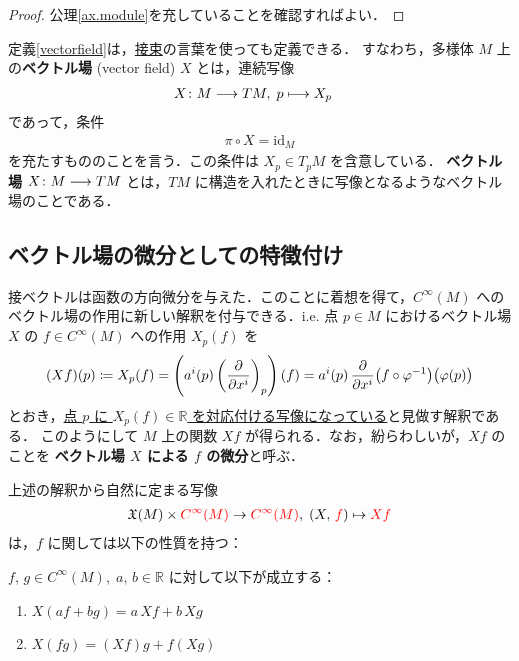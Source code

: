\documentclass[geometry_main]{subfiles}
\begin{document}
\begin{proof}
	公理\ref{ax.module}を充していることを確認すればよい．
\end{proof}

定義\ref{vectorfield}は，\hyperref[def:bundle-tangent]{接束}の言葉を使っても定義できる．
すなわち，\cinfty 多様体 $M$ 上の\textbf{ベクトル場} (vector field) $X$ とは，連続写像
\begin{align}
	X \colon M &\longrightarrow TM,\; p \longmapsto X_p
\end{align}
であって，条件
\begin{align}
	\pi \circ X = \mathrm{id}_M
\end{align}
を充たすもののことを言う．この条件は $X_p \in T_p M$ を含意している．
\cinfty \textbf{ベクトル場} $X\colon M \longrightarrow TM$ とは，$TM$ に\cinfty 構造を入れたときに\cinfty 写像となるようなベクトル場のことである．

\subsection{ベクトル場の微分としての特徴付け}

接ベクトルは函数の方向微分を与えた．このことに着想を得て，$C^\infty (M)$ へのベクトル場の作用に新しい解釈を付与できる．i.e. 点 $p \in M$ におけるベクトル場 $X$ の $f \in C^\infty (M)$ への作用 $X_p(f)$ を
\begin{align}
	(Xf)(p) \coloneqq X_p(f) = \left(a^i(p) \left(\pdv{}{x^i}\right)_p\right)(f) = a^i(p)\, \pdv{}{x^i}\bigl(f \circ \varphi^{-1} \bigr)\bigl(\varphi(p)\bigr)
\end{align}
とおき，\underline{点 $p$ に $X_p(f) \in \mathbb{R}$ を対応付ける写像になっている}と見做す解釈である．
このようにして $M$ 上の\cinfty 関数 $Xf$ が得られる．なお，紛らわしいが，$Xf$ のことを \textbf{ベクトル場 $X$ による $f$ の微分}と呼ぶ．

上述の解釈から自然に定まる写像
\begin{align}
	\mathfrak{X}(M) \times \textcolor{red}{C^\infty (M)} \to \textcolor{red}{C^\infty(M)},\; (X,\, \textcolor{red}{f}) \mapsto \textcolor{red}{Xf}
\end{align}
は，$f$ に関しては以下の性質を持つ：

\begin{myprop}[label=char_diff]{}
	$f,\, g \in C^\infty (M),\; a,\, b \in \mathbb{R}$ に対して以下が成立する：
	\begin{enumerate}
		\item $X(af + bg) = a\, Xf + b\, Xg$
		\item $X(fg) = (Xf) g + f (Xg)$
	\end{enumerate}
\end{myprop}
\end{document}
